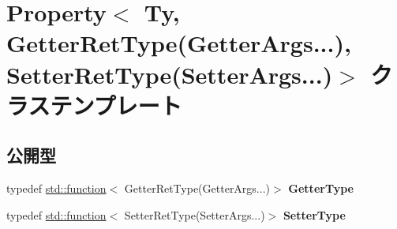 \hypertarget{class_property_3_01_ty_00_01_getter_ret_type_07_getter_args_8_8_8_08_00_01_setter_ret_type_07_setter_args_8_8_8_08_4}{}\section{Property$<$ Ty, Getter\+Ret\+Type(Getter\+Args...), Setter\+Ret\+Type(Setter\+Args...)$>$ クラステンプレート}
\label{class_property_3_01_ty_00_01_getter_ret_type_07_getter_args_8_8_8_08_00_01_setter_ret_type_07_setter_args_8_8_8_08_4}
\subsection*{公開型}
\begin{DoxyCompactItemize}
\item 
typedef \hyperlink{classstd_1_1function}{std\+::function}$<$ Getter\+Ret\+Type(Getter\+Args...)$>$ {\bfseries Getter\+Type}\hypertarget{class_property_3_01_ty_00_01_getter_ret_type_07_getter_args_8_8_8_08_00_01_setter_ret_type_07_setter_args_8_8_8_08_4_a11a6b38e03da66fe4b1c11fb8aa7cf79}{}\label{class_property_3_01_ty_00_01_getter_ret_type_07_getter_args_8_8_8_08_00_01_setter_ret_type_07_setter_args_8_8_8_08_4_a11a6b38e03da66fe4b1c11fb8aa7cf79}

\item 
typedef \hyperlink{classstd_1_1function}{std\+::function}$<$ Setter\+Ret\+Type(Setter\+Args...)$>$ {\bfseries Setter\+Type}\hypertarget{class_property_3_01_ty_00_01_getter_ret_type_07_getter_args_8_8_8_08_00_01_setter_ret_type_07_setter_args_8_8_8_08_4_a036ecb4136de1beda1a327df0694c315}{}\label{class_property_3_01_ty_00_01_getter_ret_type_07_getter_args_8_8_8_08_00_01_setter_ret_type_07_setter_args_8_8_8_08_4_a036ecb4136de1beda1a327df0694c315}

\end{DoxyCompactItemize}

